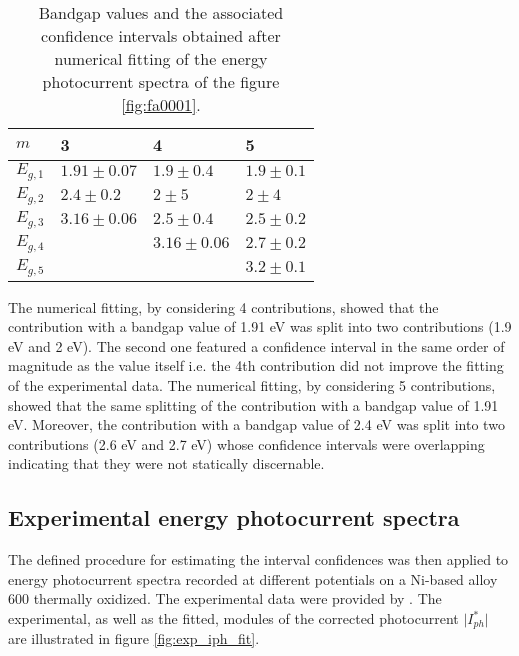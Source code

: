 \begin{table}[htb]
\small
\centering
\begin{tabular}{ p{2cm}|p{4cm}|p{4cm}| p{4cm}}
\toprule
 $m$ & 3 & 4 &  5\\
\midrule
$E_{g,1}$ & $1.91 \pm 0.07$    & $1.9 \pm 0.4$      & $1.9 \pm 0.1$ \\
$E_{g,2}$ &  $2.4 \pm 0.2$      & $2 \pm 5$           & $2 \pm 4$\\
$E_{g,3}$ & $3.16 \pm 0.06$    & $2.5 \pm 0.4$     &  $2.5 \pm 0.2$\\
$E_{g,4}$ &                           &  $3.16 \pm 0.06$ &   $2.7 \pm 0.2$    \\
$E_{g,5}$ &                           &                         &    $3.2 \pm 0.1$     \\
 \bottomrule
\end{tabular}
\caption{Bandgap values and the associated confidence intervals obtained after 
    numerical fitting of the energy photocurrent spectra of the figure \ref{fig:fa0001}.}
\label{table:result_noise_contributions}
\end{table}




The numerical fitting, by considering 4 contributions, showed that the contribution 
with a bandgap value of 1.91 
eV was split into two contributions (1.9 eV and 2 eV). The second one featured 
a confidence interval in the same 
order of magnitude as the value itself i.e. the 4th contribution did not 
improve the fitting of the experimental 
data. 
The numerical fitting, by considering 5 contributions, showed that the same 
splitting of the contribution with a 
bandgap value of 1.91 eV. Moreover, the contribution with a bandgap value 
of 2.4 eV was split into two contributions (2.6 eV and 2.7 eV) whose confidence 
intervals were overlapping indicating that they were not statically discernable.

\subsection{Experimental energy photocurrent spectra}
The defined procedure for estimating the interval confidences was then applied 
to energy photocurrent spectra recorded at different potentials on a Ni-based 
alloy 600 thermally oxidized. The experimental data were provided by \citet{petit2013}. 
The experimental, as well as the fitted, modules of the corrected photocurrent 
$\vert I_{ph}^* \vert$ are illustrated in figure \ref{fig:exp_iph_fit}. 

